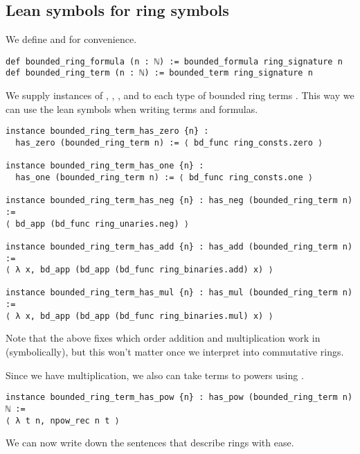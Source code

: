 \subsection{Lean symbols for ring symbols}

We define  and 
for convenience.

\begin{lstlisting}
def bounded_ring_formula (n : ℕ) := bounded_formula ring_signature n
def bounded_ring_term (n : ℕ) := bounded_term ring_signature n\end{lstlisting}

We supply instances of , , ,
 and  to each type of bounded ring terms
.
This way we can use the lean symbols when writing terms and formulas.

\begin{lstlisting}
instance bounded_ring_term_has_zero {n} :
  has_zero (bounded_ring_term n) := ⟨ bd_func ring_consts.zero ⟩

instance bounded_ring_term_has_one {n} :
  has_one (bounded_ring_term n) := ⟨ bd_func ring_consts.one ⟩

instance bounded_ring_term_has_neg {n} : has_neg (bounded_ring_term n) :=
⟨ bd_app (bd_func ring_unaries.neg) ⟩

instance bounded_ring_term_has_add {n} : has_add (bounded_ring_term n) :=
⟨ λ x, bd_app (bd_app (bd_func ring_binaries.add) x) ⟩

instance bounded_ring_term_has_mul {n} : has_mul (bounded_ring_term n) :=
⟨ λ x, bd_app (bd_app (bd_func ring_binaries.mul) x) ⟩\end{lstlisting}

Note that the above fixes which order
addition and multiplication work in (symbolically),
but this won't matter once we interpret into commutative rings.

Since we have multiplication, we also can take terms to powers
using .

\begin{lstlisting}
instance bounded_ring_term_has_pow {n} : has_pow (bounded_ring_term n) ℕ :=
⟨ λ t n, npow_rec n t ⟩
\end{lstlisting}

We can now write down the sentences that describe rings with ease.

